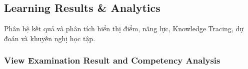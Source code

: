 \documentclass[12pt,a4paper,oneside]{report}
\begin{document}

\subsection{Learning Results \& Analytics}
\label{subsec:learning-results-analytics}

Phân hệ kết quả và phân tích hiển thị điểm, năng lực, Knowledge Tracing, dự đoán và khuyến nghị học tập.

\subsubsection{View Examination Result and Competency Analysis}
\label{subsubsec:view-exam-result-analysis}
\end{document}
